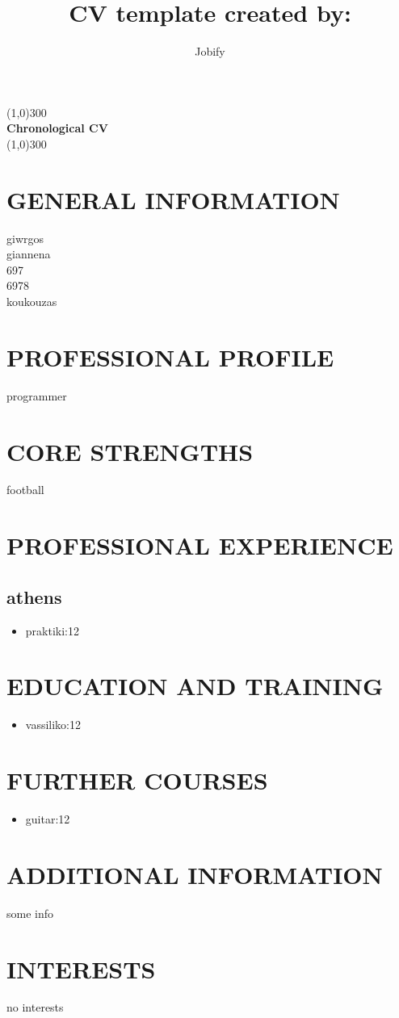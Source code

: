 \documentclass{article}
\title{CV template created by:}
\author{Jobify}
\begin{document}
\maketitle
	\begin{center}
	\line(1,0){300}\\
	[0.25in]
	\huge{\bfseries Chronological CV}\\
	[2mm]
	\line(1,0){300}\\
	[1.5cm]
	\end{center}
\section{GENERAL INFORMATION}
giwrgos\\
giannena\\
697\\
6978\\
koukouzas\\
\section{PROFESSIONAL PROFILE}
programmer\\
\section{CORE STRENGTHS}
football\\
\section{PROFESSIONAL EXPERIENCE}
\subsection{athens}
\begin{itemize}
\item praktiki:12
\end{itemize}
\section{EDUCATION AND TRAINING}
\begin{itemize}
\item vassiliko:12
\end{itemize}
\section{FURTHER COURSES}
\begin{itemize}
\item guitar:12
\end{itemize}
\section{ADDITIONAL INFORMATION}
some info\\
\section{INTERESTS}
no interests\\
\end{document}
